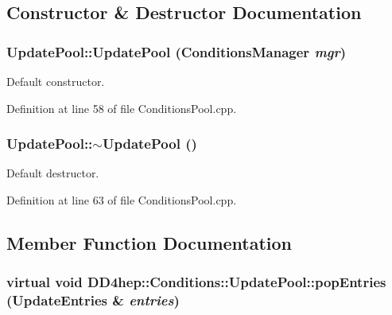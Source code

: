 \subsection{Constructor \& Destructor Documentation}
\hypertarget{class_d_d4hep_1_1_conditions_1_1_update_pool_a906a53034c9d5f71194f1f0e0e0a82d2}{
\subsubsection[{UpdatePool}]{\setlength{\rightskip}{0pt plus 5cm}UpdatePool::UpdatePool ({\bf ConditionsManager} {\em mgr})}}
\label{class_d_d4hep_1_1_conditions_1_1_update_pool_a906a53034c9d5f71194f1f0e0e0a82d2}


Default constructor. 

Definition at line 58 of file ConditionsPool.cpp.\hypertarget{class_d_d4hep_1_1_conditions_1_1_update_pool_a6f6e54abf8c2d19be9166686fcd51215}{
\subsubsection[{$\sim$UpdatePool}]{\setlength{\rightskip}{0pt plus 5cm}UpdatePool::$\sim$UpdatePool ()}}
\label{class_d_d4hep_1_1_conditions_1_1_update_pool_a6f6e54abf8c2d19be9166686fcd51215}


Default destructor. 

Definition at line 63 of file ConditionsPool.cpp.

\subsection{Member Function Documentation}
\hypertarget{class_d_d4hep_1_1_conditions_1_1_update_pool_aeb7494e79ae47538aa4f6ca2cb7c4b4d}{
\subsubsection[{popEntries}]{\setlength{\rightskip}{0pt plus 5cm}virtual void DD4hep::Conditions::UpdatePool::popEntries ({\bf UpdateEntries} \& {\em entries})}}
\label{class_d_d4hep_1_1_conditions_1_1_update_pool_aeb7494e79ae47538aa4f6ca2cb7c4b4d}


